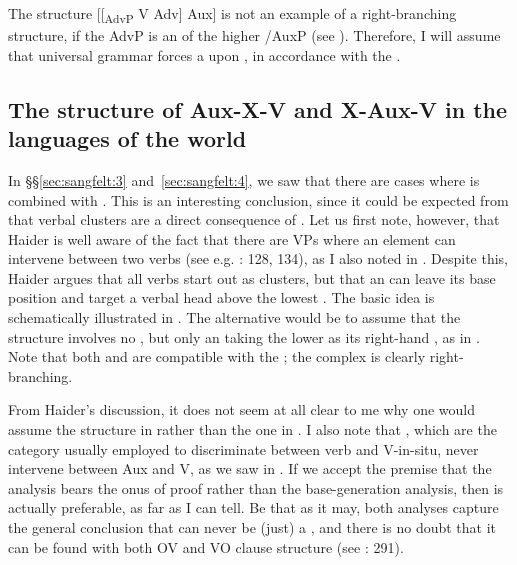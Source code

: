 \documentclass[output=paper, colorlinks, citecolor=brown]{langscibook}
\begin{document}
The structure [[\textsubscript{AdvP} V Adv] Aux] is not an example of a right-branching structure, if the AdvP is an  of the higher /AuxP (see \citealt{Haider2013}). Therefore, I will assume that universal grammar forces a  upon , in accordance with the . 


\subsection{The structure of Aux-X-V and X-Aux-V in the languages of the world}\label{sec:sangfelt:5.2}

In §§\ref{sec:sangfelt:3} and~\ref{sec:sangfelt:4}, we saw that there are cases where  is combined with . This is an interesting conclusion, since it could be expected from \citet{Haider2010} that verbal clusters are a direct consequence of . Let us first note, however, that Haider is well aware of the fact that there are  VPs where an element can intervene between two verbs (see e.g. \citealt{Haider2013}: 128, 134), as I also noted in . Despite this, Haider argues that all verbs start out as clusters, but that an  can leave its base position and target a verbal head above the lowest  \parencites[290–291]{Haider2010}[134]{Haider2013}. The basic idea is schematically illustrated in . The alternative would be to assume that the structure involves no , but only an  taking the lower  as its right-hand , as in . Note that both  and  are compatible with the ; the complex  is clearly right-branching.

\settowidth{}
\ea
\label{ex:sangfelt:30}
 
 
\z 
\z

From Haider’s discussion, it does not seem at all clear to me why one would assume the structure in  rather than the one in . I also note that , which are the category usually employed to discriminate between verb  and V-in-situ, never intervene between Aux and V, as we saw in . If we accept the premise that the  analysis bears the onus of proof rather than the base-generation analysis, then  is actually preferable, as far as I can tell. Be that as it may, both analyses capture the general conclusion that  can never be (just) a , and there is no doubt that it can be found with both OV and VO clause structure (see \citealt{Haider2010}: 291).
\end{document}
